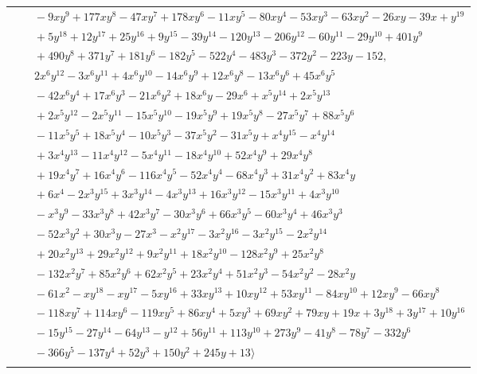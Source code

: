 \documentclass[11pt]{article}
\begin{document}
\begin{longtable}{@{}ll@{}}
 & $\quad -9xy^{9}+177xy^{8}-47xy^{7}+178xy^{6}-11xy^{5}-80xy^{4}-53xy^{3}-63xy^{2}-26xy-39x+y^{19}$\\
 & $\quad +5y^{18}+12y^{17}+25y^{16}+9y^{15}-39y^{14}-120y^{13}-206y^{12}-60y^{11}-29y^{10}+401y^{9}$\\
 & $\quad +490y^{8}+371y^{7}+181y^{6}-182y^{5}-522y^{4}-483y^{3}-372y^{2}-223y-152,$\\
 & $\quad 2x^{6}y^{12}-3x^{6}y^{11}+4x^{6}y^{10}-14x^{6}y^{9}+12x^{6}y^{8}-13x^{6}y^{6}+45x^{6}y^{5}$\\
 & $\quad -42x^{6}y^{4}+17x^{6}y^{3}-21x^{6}y^{2}+18x^{6}y-29x^{6}+x^{5}y^{14}+2x^{5}y^{13}$\\
 & $\quad +2x^{5}y^{12}-2x^{5}y^{11}-15x^{5}y^{10}-19x^{5}y^{9}+19x^{5}y^{8}-27x^{5}y^{7}+88x^{5}y^{6}$\\
 & $\quad -11x^{5}y^{5}+18x^{5}y^{4}-10x^{5}y^{3}-37x^{5}y^{2}-31x^{5}y+x^{4}y^{15}-x^{4}y^{14}$\\
 & $\quad +3x^{4}y^{13}-11x^{4}y^{12}-5x^{4}y^{11}-18x^{4}y^{10}+52x^{4}y^{9}+29x^{4}y^{8}$\\
 & $\quad +19x^{4}y^{7}+16x^{4}y^{6}-116x^{4}y^{5}-52x^{4}y^{4}-68x^{4}y^{3}+31x^{4}y^{2}+83x^{4}y$\\
 & $\quad +6x^{4}-2x^{3}y^{15}+3x^{3}y^{14}-4x^{3}y^{13}+16x^{3}y^{12}-15x^{3}y^{11}+4x^{3}y^{10}$\\
 & $\quad -x^{3}y^{9}-33x^{3}y^{8}+42x^{3}y^{7}-30x^{3}y^{6}+66x^{3}y^{5}-60x^{3}y^{4}+46x^{3}y^{3}$\\
 & $\quad -52x^{3}y^{2}+30x^{3}y-27x^{3}-x^{2}y^{17}-3x^{2}y^{16}-3x^{2}y^{15}-2x^{2}y^{14}$\\
 & $\quad +20x^{2}y^{13}+29x^{2}y^{12}+9x^{2}y^{11}+18x^{2}y^{10}-128x^{2}y^{9}+25x^{2}y^{8}$\\
 & $\quad -132x^{2}y^{7}+85x^{2}y^{6}+62x^{2}y^{5}+23x^{2}y^{4}+51x^{2}y^{3}-54x^{2}y^{2}-28x^{2}y$\\
 & $\quad -61x^{2}-xy^{18}-xy^{17}-5xy^{16}+33xy^{13}+10xy^{12}+53xy^{11}-84xy^{10}+12xy^{9}-66xy^{8}$\\
 & $\quad -118xy^{7}+114xy^{6}-119xy^{5}+86xy^{4}+5xy^{3}+69xy^{2}+79xy+19x+3y^{18}+3y^{17}+10y^{16}$\\
 & $\quad -15y^{15}-27y^{14}-64y^{13}-y^{12}+56y^{11}+113y^{10}+273y^{9}-41y^{8}-78y^{7}-332y^{6}$\\
 & $\quad -366y^{5}-137y^{4}+52y^{3}+150y^{2}+245y+13\rangle$\\
\addlinespace[2pt]
\multicolumn{2}{@{}p{0.97\textwidth}@{}}{$i=18$, $D_i=1$, $\rho_{ij}$: $2{:}1, \allowbreak 3{:}2, \allowbreak 5{:}1, \allowbreak 6{:}1, \allowbreak 13{:}2, \allowbreak 15{:}1, \allowbreak 19{:}2$}\\

\end{longtable}
\end{document}
